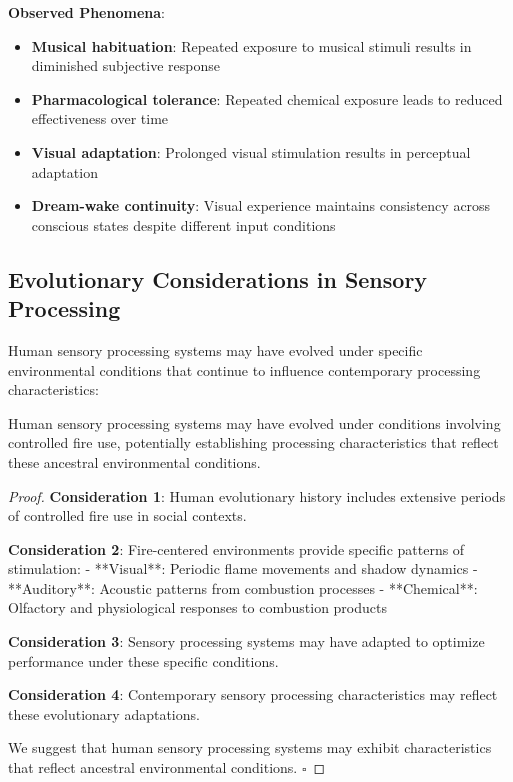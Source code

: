 \documentclass[12pt,a4paper]{article}
\begin{document}
\textbf{Observed Phenomena}:
\begin{itemize}
\item \textbf{Musical habituation}: Repeated exposure to musical stimuli results in diminished subjective response
\item \textbf{Pharmacological tolerance}: Repeated chemical exposure leads to reduced effectiveness over time
\item \textbf{Visual adaptation}: Prolonged visual stimulation results in perceptual adaptation
\item \textbf{Dream-wake continuity}: Visual experience maintains consistency across conscious states despite different input conditions
\end{itemize}

\subsection{Evolutionary Considerations in Sensory Processing}

Human sensory processing systems may have evolved under specific environmental conditions that continue to influence contemporary processing characteristics:

\begin{hypothesis}
Human sensory processing systems may have evolved under conditions involving controlled fire use, potentially establishing processing characteristics that reflect these ancestral environmental conditions.
\end{hypothesis}

\begin{proof}
\textbf{Consideration 1}: Human evolutionary history includes extensive periods of controlled fire use in social contexts.

\textbf{Consideration 2}: Fire-centered environments provide specific patterns of stimulation:
- **Visual**: Periodic flame movements and shadow dynamics
- **Auditory**: Acoustic patterns from combustion processes
- **Chemical**: Olfactory and physiological responses to combustion products

\textbf{Consideration 3}: Sensory processing systems may have adapted to optimize performance under these specific conditions.

\textbf{Consideration 4}: Contemporary sensory processing characteristics may reflect these evolutionary adaptations.

We suggest that human sensory processing systems may exhibit characteristics that reflect ancestral environmental conditions. $\square$
\end{proof}
\end{document}
